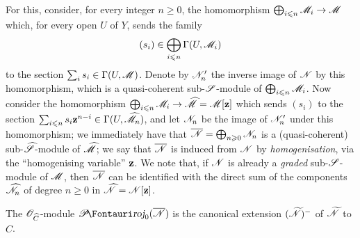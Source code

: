 \begin{env}[8.13.2]
\label{II.8.13.2}
For this, consider, for every integer $n\geq0$, the homomorphism $\bigoplus_{i\leq n}\sh{M}_i\to\sh{M}$ which, for every open $U$ of $Y$, sends the family
\[
    (s_i) \in \bigoplus_{i\leqslant n}\Gamma(U,\mathscr{M}_i)
\]
to the section $\sum_i s_i\in\Gamma(U,\mathscr{M})$.
Denote by $\mathscr{N}'_n$ the inverse image of $\mathscr{N}$ by this homomorphism, which is a quasi-coherent sub-$\mathscr{S}$-module of $\bigoplus_{i\leqslant n}\mathscr{M}_i$.
Now consider the homomorphism $\bigoplus_{i\leq n}\sh{M}_i\to\widehat{\sh{M}}=\sh{M}[\bb{z}]$ which sends $(s_i)$ to the section $\sum_{i\leqslant n}s_i\mathbf{z}^{n-i}\in\Gamma(U,\widehat{\mathscr{M}}_n)$, and let $\mathscr{N}_n$ be the image of $\mathscr{N}'_n$ under this homomorphism;
we immediately have that $\overline{\mathscr{N}}=\bigoplus_{n\geqslant0}\mathscr{N}_n$ is a (quasi-coherent) sub-$\widehat{\mathscr{S}}$-module of $\widehat{\mathscr{M}}$;
we say that $\overline{\mathscr{N}}$ is induced from $\mathscr{N}$ by \emph{homogenisation}, via the ``homogenising variable'' $\mathbf{z}$.
We note
that, if $\mathscr{N}$ is already a \emph{graded} sub-$\mathscr{S}$-module of $\mathscr{M}$, then $\overline{\mathscr{N}}$ can be identified with the direct sum of the components $\widehat{\mathscr{N}}_n$ of degree $n\geq0$ in $\widehat{\mathscr{N}}=\mathscr{N}[\mathbf{z}]$.
\end{env}

\begin{proposition}[8.13.3]
\label{II.8.13.3}
The $\mathscr{O}_{\widehat{C}}$-module $\shProj_0(\overline{\sh{N}})$ is the canonical extension $(\widetilde{\mathscr{N}})^-$ of $\widetilde{\mathscr{N}}$ to $\widehat{C}$.
\end{proposition}

